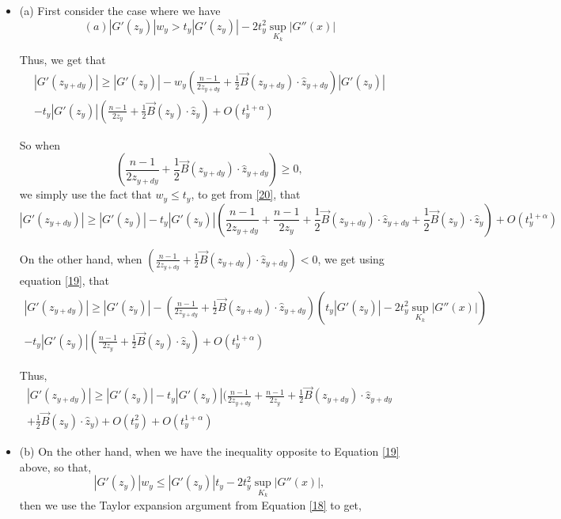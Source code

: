 \documentclass{article}
\theoremstyle{plain}
\theoremstyle{definition}
\theoremstyle{plain}
\begin{document}
\begin{itemize}
    \item 

(a) First consider the case where we have
\begin{equation} \label{19}
(a) |G'(z_y)| w_y > t_y |G'(z_y)| - 2 t_y^2 \sup_{K_k} |G''(x)|
\end{equation}

Thus, we get that
\begin{multline} \label{20}
|G'(z_{y+dy})| \ge |G'(z_y)| - w_y \left( \frac{n-1}{2 z_{y+dy}} + \frac{1}{2} \vec{B}(z_{y+dy}) \cdot \hat{z}_{y+dy} \right) |G'(z_y)| \\
- t_y |G'(z_y)| \left( \frac{n-1}{2 z_y} + \frac{1}{2} \vec{B}(z_y) \cdot \hat{z}_y \right) + O(t_y^{1+\alpha})
\end{multline}

So when $$\left( \frac{n-1}{2 z_{y+dy}} + \frac{1}{2} \vec{B}(z_{y+dy}) \cdot \hat{z}_{y+dy} \right) \ge 0,$$ we simply use the fact that $w_y \le t_y$, to get from \ref{20}, that
\begin{equation} \label{21}
|G'(z_{y+dy})| \ge |G'(z_y)| - t_y |G'(z_y)| \left( \frac{n-1}{2 z_{y+dy}} + \frac{n-1}{2 z_y} + \frac{1}{2} \vec{B}(z_{y+dy}) \cdot \hat{z}_{y+dy} + \frac{1}{2} \vec{B}(z_y) \cdot \hat{z}_y \right) + O(t_y^{1+\alpha})
\end{equation}

 On the other hand, when $\left( \frac{n-1}{2 z_{y+dy}} + \frac{1}{2} \vec{B}(z_{y+dy}) \cdot \hat{z}_{y+dy} \right) < 0$, we get using equation \ref{19}, that
\begin{multline}
|G'(z_{y+dy})| \ge |G'(z_y)| - \left( \frac{n-1}{2 z_{y+dy}} + \frac{1}{2} \vec{B}(z_{y+dy}) \cdot \hat{z}_{y+dy} \right) \left( t_y |G'(z_y)| - 2 t_y^2 \sup_{K_k} |G''(x)| \right) \\
- t_y |G'(z_y)| \left( \frac{n-1}{2 z_y} + \frac{1}{2} \vec{B}(z_y) \cdot \hat{z}_y \right) + O(t_y^{1+\alpha})
\end{multline}

Thus,
\begin{multline} \label{eq71}
|G'(z_{y+dy})| \ge |G'(z_y)| - t_y |G'(z_y)| \Big( \frac{n-1}{2 z_{y+dy}} + \frac{n-1}{2 z_y} + \frac{1}{2} \vec{B}(z_{y+dy}) \cdot \hat{z}_{y+dy} \\+ \frac{1}{2} \vec{B}(z_y) \cdot \hat{z}_y \Big) + O(t_y^2) + O(t_y^{1+\alpha})
\end{multline}

\item (b) On the other hand, when we have the inequality opposite to Equation \ref{19} above, so that, $$|G'(z_y)| w_y \le |G'(z_y)| t_y - 2 t_y^2 \sup_{K_k} |G''(x)|,$$ then we use the Taylor expansion argument from Equation \ref{18} to get,


\end{itemize}
\end{document}
